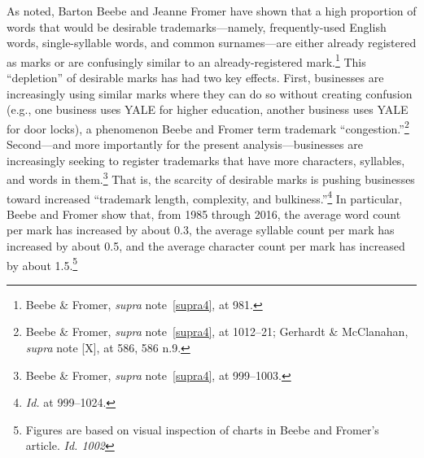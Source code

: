 \documentclass[letterpaper, 11pt, oneside]{article}
\begin{document}
As noted, Barton Beebe and Jeanne Fromer have shown that a high proportion of words that would be desirable trademarks—namely, frequently-used English words, single-syllable words, and common surnames—are either already registered as marks or are confusingly similar to an already-registered mark.\footnote{Beebe \& Fromer, \textit{supra} note~\ref{supra4}, at 981.} This ``depletion'' of desirable marks has had two key effects. First, businesses are increasingly using similar marks where they can do so without creating confusion (e.g., one business uses YALE for higher education, another business uses YALE for door locks), a phenomenon Beebe and Fromer term trademark ``congestion.''\footnote{Beebe \& Fromer, \textit{supra} note~\ref{supra4}, at 1012–21; Gerhardt \& McClanahan, \textit{supra} note [X], at 586, 586 n.9.} Second—and more importantly for the present analysis—businesses are increasingly seeking to register trademarks that have more characters, syllables, and words in them.\footnote{Beebe \& Fromer, \textit{supra} note~\ref{supra4}, at 999–1003.} That is, the scarcity of desirable marks is pushing businesses toward increased ``trademark length, complexity, and bulkiness.''\footnote{\textit{Id.} at 999–1024.}  In particular, Beebe and Fromer show that, from 1985 through 2016, the average word count per mark has increased by about 0.3, the average syllable count per mark has increased by about 0.5, and the average character count per mark has increased by about 1.5.\footnote{Figures are based on visual inspection of charts in Beebe and Fromer's article. \textit{Id. 1002}}
\end{document}
